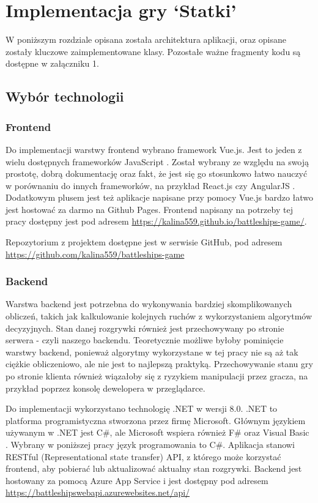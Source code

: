

\newpage %
\section{Implementacja gry ‘Statki’}

W poniższym rozdziale opisana została architektura aplikacji, oraz opisane zostały kluczowe zaimplementowane klasy. Pozostałe ważne fragmenty kodu są dostępne w załączniku 1.

\subsection{Wybór technologii}

\subsubsection{Frontend}
\indent Do implementacji warstwy frontend wybrano framework Vue.js. Jest to jeden z wielu dostępnych frameworków JavaScript \cite{vuejs}. Został wybrany ze względu na swoją prostotę, dobrą dokumentację oraz fakt, że jest się go stosunkowo łatwo nauczyć w porównaniu do innych frameworków, na przykład React.js czy AngularJS \cite{whyChooseVue}.
Dodatkowym plusem jest też aplikacje napisane przy pomocy Vue.js bardzo łatwo jest hostować za darmo na Github Pages. Frontend napisany na potrzeby tej pracy dostępny jest pod adresem \url{https://kalina559.github.io/battleships-game/}.

\indent Repozytorium z projektem dostępne jest w serwisie GitHub, pod adresem \url{https://github.com/kalina559/battleships-game}
\subsubsection{Backend}
\indent Warstwa backend jest potrzebna do wykonywania bardziej skomplikowanych obliczeń, takich jak kalkulowanie kolejnych ruchów z wykorzystaniem algorytmów decyzyjnych. Stan danej rozgrywki również jest przechowywany po stronie serwera - czyli naszego backendu. Teoretycznie możliwe byłoby pominięcie warstwy backend, ponieważ algorytmy wykorzystane w tej pracy nie są aż tak ciężkie obliczeniowo, ale nie jest to najlepszą praktyką. Przechowywanie stanu gry po stronie klienta również wiązałoby się z ryzykiem manipulacji przez gracza, na przykład poprzez konsolę dewelopera w przeglądarce.

\indent Do implementacji wykorzystano technologię .NET w wersji 8.0. .NET to platforma programistyczna stworzona przez firmę Microsoft. Głównym językiem używanym w .NET jest C\#, ale Microsoft wspiera również F\# oraz Visual Basic \cite{whatisdotnet} \cite{dotnetlanguages}. Wybrany w poniższej pracy język programowania to C\#. Aplikacja stanowi RESTful (Representational state transfer) API, z którego może korzystać frontend, aby pobierać lub aktualizować aktualny stan rozgrywki. Backend jest hostowany za pomocą Azure App Service i jest dostępny pod adresem \url{https://battleshipswebapi.azurewebsites.net/api/}


